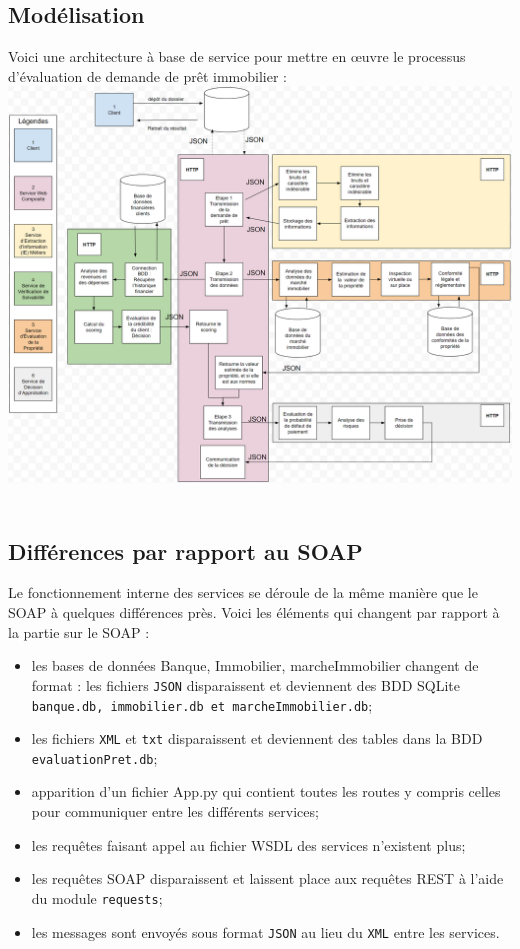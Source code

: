 \documentclass{article}
\begin{document}
    \subsection{Modélisation}
     Voici une architecture à base de service pour mettre en œuvre le processus d’évaluation de demande de prêt immobilier :
    \\
    \includegraphics[width=\textwidth]{Images/10.1/modelisation_JSON.png}\\
    \\
    \subsection{Différences par rapport au SOAP}
    Le fonctionnement interne des services se déroule de la même manière que le SOAP à quelques différences près. Voici les éléments qui changent par rapport à la partie sur le SOAP :
    \begin{itemize}
        \item les bases de données Banque, Immobilier, marcheImmobilier changent de format : les fichiers \texttt{JSON} disparaissent et deviennent des BDD SQLite \texttt{banque.db, immobilier.db et marcheImmobilier.db};
        \item les fichiers \texttt{XML} et \texttt{txt} disparaissent et deviennent des tables dans la BDD \texttt{evaluationPret.db};
        \item apparition d'un fichier App.py qui contient toutes les routes y compris celles pour communiquer entre les différents services;
        \item les requêtes faisant appel au fichier WSDL des services n'existent plus;
        \item les requêtes SOAP disparaissent et laissent place aux requêtes REST à l'aide du module \texttt{requests};
        \item les messages sont envoyés sous format \texttt{JSON} au lieu du \texttt{XML} entre les services.
    \end{itemize}
\end{document}
